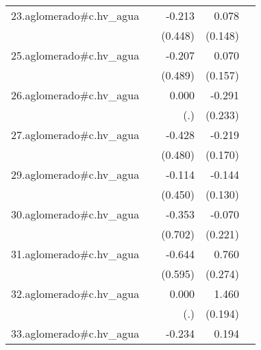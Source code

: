 {\begin{longtable}{l*{4}{D{.}{.}{-1}}}
\addlinespace
23.aglomerado#c.hv\_agua&                     &      -0.213         &       0.078         &                     \\
            &                     &     (0.448)         &     (0.148)         &                     \\
\addlinespace
25.aglomerado#c.hv\_agua&                     &      -0.207         &       0.070         &                     \\
            &                     &     (0.489)         &     (0.157)         &                     \\
\addlinespace
26.aglomerado#c.hv\_agua&                     &       0.000         &      -0.291         &                     \\
            &                     &         (.)         &     (0.233)         &                     \\
\addlinespace
27.aglomerado#c.hv\_agua&                     &      -0.428         &      -0.219         &                     \\
            &                     &     (0.480)         &     (0.170)         &                     \\
\addlinespace
29.aglomerado#c.hv\_agua&                     &      -0.114         &      -0.144         &                     \\
            &                     &     (0.450)         &     (0.130)         &                     \\
\addlinespace
30.aglomerado#c.hv\_agua&                     &      -0.353         &      -0.070         &                     \\
            &                     &     (0.702)         &     (0.221)         &                     \\
\addlinespace
31.aglomerado#c.hv\_agua&                     &      -0.644         &       0.760\sym{**} &                     \\
            &                     &     (0.595)         &     (0.274)         &                     \\
\addlinespace
32.aglomerado#c.hv\_agua&                     &       0.000         &       1.460\sym{***}&                     \\
            &                     &         (.)         &     (0.194)         &                     \\
\addlinespace
33.aglomerado#c.hv\_agua&                     &      -0.234         &       0.194\sym{**} &                     \\

\end{longtable}}
